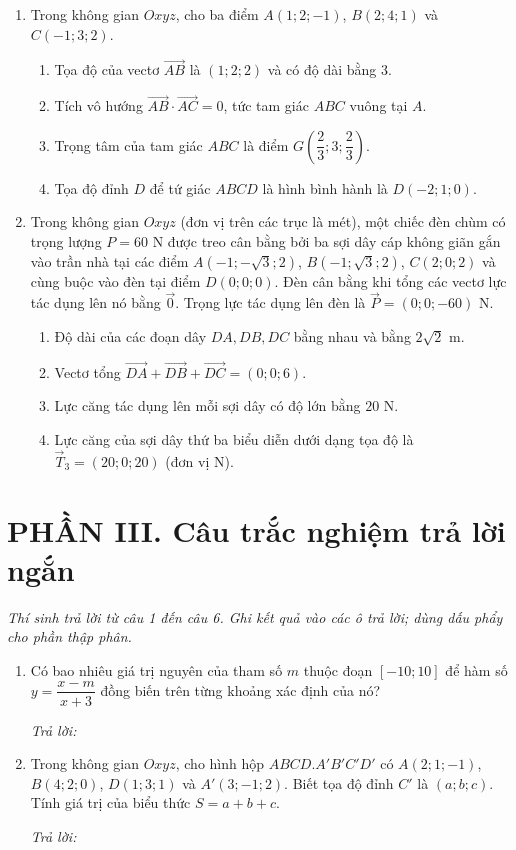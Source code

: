 \documentclass[12pt,a4paper]{article}
\newcommand{\otraloi}{\par\nobreak\smallskip\noindent\textit{Trả lời:}\quad\fbox{\rule{0pt}{11pt}\makebox[0.3cm]{}}\,\fbox{\rule{0pt}{11pt}\makebox[0.3cm]{}}\,\fbox{\rule{0pt}{11pt}\makebox[0.3cm]{}}\,\fbox{\rule{0pt}{11pt}\makebox[0.3cm]{}}}
\begin{document}
\begin{enumerate}[start=3]
\item Trong không gian $Oxyz$, cho ba điểm $A(1;2;-1)$, $B(2;4;1)$ và $C(-1;3;2)$.
\begin{enumerate}
\item Tọa độ của vectơ $\overrightarrow{AB}$ là $(1;2;2)$ và có độ dài bằng $3$.
\item Tích vô hướng $\overrightarrow{AB}\cdot\overrightarrow{AC}=0$, tức tam giác $ABC$ vuông tại $A$.
\item Trọng tâm của tam giác $ABC$ là điểm $G\left(\dfrac23;3;\dfrac23\right)$.
\item Tọa độ đỉnh $D$ để tứ giác $ABCD$ là hình bình hành là $D(-2;1;0)$.
\end{enumerate}

\item Trong không gian $Oxyz$ (đơn vị trên các trục là mét), một chiếc đèn chùm có trọng lượng $P=60$ N được treo cân bằng bởi ba sợi dây cáp không giãn gắn vào trần nhà tại các điểm $A(-1;-\sqrt3;2)$, $B(-1;\sqrt3;2)$, $C(2;0;2)$ và cùng buộc vào đèn tại điểm $D(0;0;0)$. Đèn cân bằng khi tổng các vectơ lực tác dụng lên nó bằng $\vec0$. Trọng lực tác dụng lên đèn là $\vec P=(0;0;-60)$ N.
\begin{enumerate}
\item Độ dài của các đoạn dây $DA,DB,DC$ bằng nhau và bằng $2\sqrt2$ m.
\item Vectơ tổng $\overrightarrow{DA}+\overrightarrow{DB}+\overrightarrow{DC}=(0;0;6)$.
\item Lực căng tác dụng lên mỗi sợi dây có độ lớn bằng $20$ N.
\item Lực căng của sợi dây thứ ba biểu diễn dưới dạng tọa độ là $\vec T_3=(20;0;20)$ (đơn vị N).
\end{enumerate}
\end{enumerate}

\section*{\large PHẦN III. Câu trắc nghiệm trả lời ngắn}
\textit{Thí sinh trả lời từ câu 1 đến câu 6. Ghi kết quả vào các ô trả lời; dùng dấu phẩy cho phần thập phân.}
\begin{enumerate}
\item Có bao nhiêu giá trị nguyên của tham số $m$ thuộc đoạn $[-10;10]$ để hàm số $y=\dfrac{x-m}{x+3}$ đồng biến trên từng khoảng xác định của nó?
\otraloi

\item Trong không gian $Oxyz$, cho hình hộp $ABCD.A'B'C'D'$ có $A(2;1;-1)$, $B(4;2;0)$, $D(1;3;1)$ và $A'(3;-1;2)$. Biết tọa độ đỉnh $C'$ là $(a;b;c)$. Tính giá trị của biểu thức $S=a+b+c$.
\otraloi
\end{enumerate}
\end{document}
